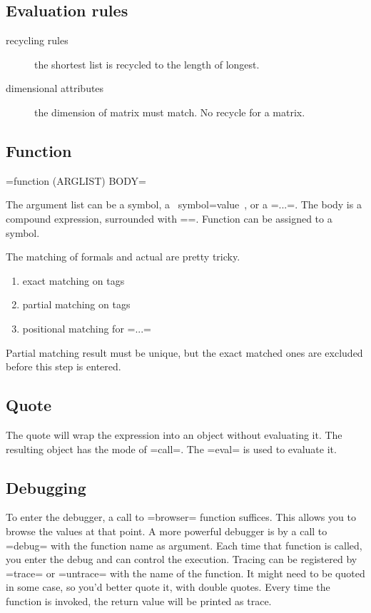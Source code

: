 \subsection{Evaluation rules}
\begin{description}
\item [recycling rules] the shortest list is recycled to the length of longest.
\item [dimensional attributes] the dimension of matrix must match. No recycle for a matrix.
\end{description}

\subsection{Function}
=function (ARGLIST) BODY=

The argument list can be a symbol, a ~symbol=value~, or a =...=.  The
body is a compound expression, surrounded with ={}=.  Function can be
assigned to a symbol.

The matching of formals and actual are pretty tricky.
\begin{enumerate}
\item exact matching on tags
\item partial matching on tags
\item positional matching for =...=
\end{enumerate}
Partial matching result must be unique, but the exact matched ones are
excluded before this step is entered.

\subsection{Quote}
The quote will wrap the expression into an object without evaluating it.
The resulting object has the mode of =call=.
The =eval= is used to evaluate it.
\subsection{Debugging}
To enter the debugger, a call to =browser= function suffices.
This allows you to browse the values at that point.
A more powerful debugger is by a call to =debug= with the function name as argument.
Each time that function is called, you enter the debug and can control the execution.
Tracing can be registered by =trace= or =untrace= with the name of the function.
It might need to be quoted in some case, so you'd better quote it, with double quotes.
Every time the function is invoked, the return value will be printed as trace.
